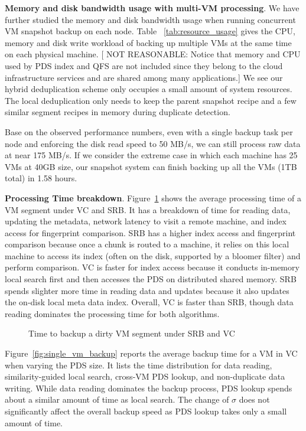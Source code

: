 {\bf Memory and disk bandwidth usage with multi-VM processing}. 
We have further studied the memory and disk bandwidth usage 
when running concurrent VM snapshot backup on each node. 
Table ~\ref{tab:resource_usage} gives the CPU, memory and disk write workload of backing up multiple VMs 
at the same time on each physical machine. 
[ NOT REASONABLE: Notice that memory and CPU used by PDS index and QFS are not included since they belong to 
the cloud infrastructure services and are shared among many applications.]
We see our hybrid deduplication scheme only occupies a small amount of system resources. 
The  local deduplication only needs to keep the parent snapshot recipe and a few similar segment recipes in 
memory during duplicate detection.

Base on the observed performance numbers, even with a single backup task per node and enforcing the disk read speed to
50 MB/s,  we can still process raw data at near 175 MB/s. If we consider the extreme case in which each machine has 25 VMs
 at 40GB size, our snapshot system can finish backing up all the VMs (1TB total) in 1.58 hours.

{\bf Processing Time breakdown}.
Figure~\ref{fig:srb_vs_vc} shows
the  average  processing  time of  a VM segment under VC and SRB. 
It has a breakdown of time for reading data, updating the metadata, network latency to visit
a remote machine, and index access for fingerprint comparison.
SRB has a higher index access and fingerprint comparison because once a chunk is routed to a machine,
it relies on this local machine to access its index (often on the disk, supported by a bloomer filter) 
and perform comparison.
VC is faster for index access because it conducts in-memory local search first and then
accesses  the PDS on distributed shared memory.  
SRB spends  slighter more time in  reading data and updates because it also updates the on-disk
local meta data index.
Overall,  VC is faster than SRB, though data reading dominates the processing time for both algorithms.

\begin{figure}[htbp]
  \centering
  \caption{Time to backup a dirty VM segment under SRB and VC}
  \label{fig:srb_vs_vc}
\end{figure}

Figure~\ref{fig:single_vm_backup} reports the average backup time for a VM in VC when
varying the PDS size.  It lists the time distribution for data reading,
similarity-guided local search, cross-VM PDS lookup, and non-duplicate data writing. 
While data reading dominates the backup process, PDS lookup spends about a similar amount
of time as local search.
The change of $\sigma$ does not significantly affect the overall backup speed as
PDS lookup takes only a small amount of time.

